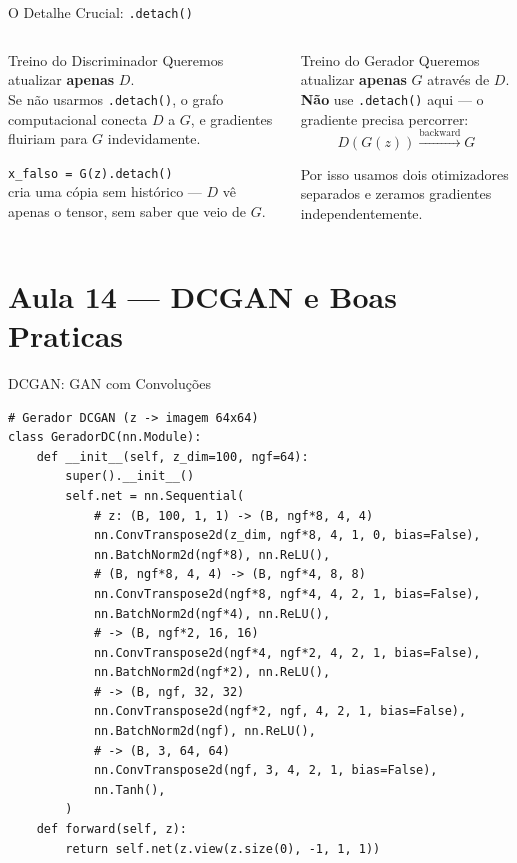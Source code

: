 \documentclass[aspectratio=169, 10pt]{beamer}
\begin{document}

\begin{frame}{O Detalhe Crucial: \texttt{.detach()}}
\begin{columns}
\begin{block}{Treino do Discriminador}
  Queremos atualizar \textbf{apenas} $D$.\\
  Se não usarmos \texttt{.detach()}, o grafo computacional conecta $D$ a $G$, 
  e gradientes fluiriam para $G$ indevidamente.
  
  \vspace{0.3em}
  \texttt{x\_falso = G(z).detach()}\\
  cria uma cópia sem histórico — $D$ vê apenas o tensor, sem saber que veio de $G$.
\end{block}

\begin{alertblock}{Treino do Gerador}
  Queremos atualizar \textbf{apenas} $G$ através de $D$.\\
  \textbf{Não} use \texttt{.detach()} aqui — o gradiente precisa percorrer:
  \[ D(G(z)) \xrightarrow{\text{backward}} G \]
  
  Por isso usamos dois otimizadores separados e zeramos gradientes independentemente.
\end{alertblock}
\end{columns}
\end{frame}

\section{Aula 14 — DCGAN e Boas Praticas}

\begin{frame}[fragile]{DCGAN: GAN com Convoluções}
\begin{lstlisting}[style=small]
# Gerador DCGAN (z -> imagem 64x64)
class GeradorDC(nn.Module):
    def __init__(self, z_dim=100, ngf=64):
        super().__init__()
        self.net = nn.Sequential(
            # z: (B, 100, 1, 1) -> (B, ngf*8, 4, 4)
            nn.ConvTranspose2d(z_dim, ngf*8, 4, 1, 0, bias=False),
            nn.BatchNorm2d(ngf*8), nn.ReLU(),
            # (B, ngf*8, 4, 4) -> (B, ngf*4, 8, 8)
            nn.ConvTranspose2d(ngf*8, ngf*4, 4, 2, 1, bias=False),
            nn.BatchNorm2d(ngf*4), nn.ReLU(),
            # -> (B, ngf*2, 16, 16)
            nn.ConvTranspose2d(ngf*4, ngf*2, 4, 2, 1, bias=False),
            nn.BatchNorm2d(ngf*2), nn.ReLU(),
            # -> (B, ngf, 32, 32)
            nn.ConvTranspose2d(ngf*2, ngf, 4, 2, 1, bias=False),
            nn.BatchNorm2d(ngf), nn.ReLU(),
            # -> (B, 3, 64, 64)
            nn.ConvTranspose2d(ngf, 3, 4, 2, 1, bias=False),
            nn.Tanh(),
        )
    def forward(self, z):
        return self.net(z.view(z.size(0), -1, 1, 1))
\end{lstlisting}
\end{frame}
\end{document}
